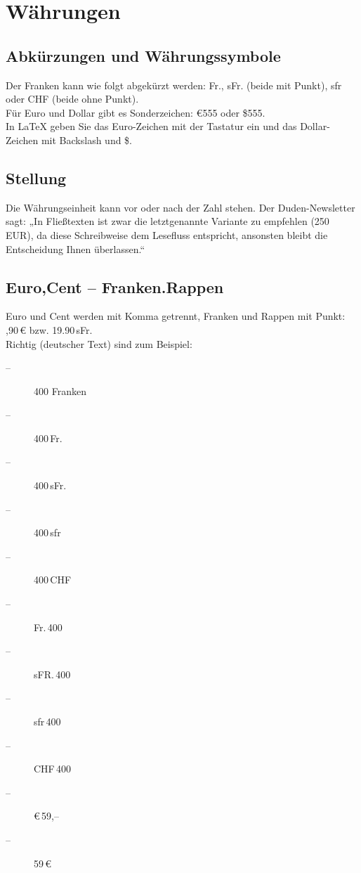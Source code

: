 \section{Währungen}
\subsection{Abkürzungen und Währungssymbole}

Der Franken kann wie folgt abgekürzt werden: Fr., sFr. (beide mit Punkt), sfr oder CHF (beide ohne Punkt). \\

Für Euro und Dollar gibt es Sonderzeichen: €555 oder \$555. \\

In LaTeX geben Sie das Euro-Zeichen mit der Tastatur ein und das Dollar-Zeichen mit Backslash und \$.

\subsection{Stellung}
Die Währungseinheit kann vor oder nach der Zahl stehen. Der Duden-Newsletter sagt: „In Fließtexten ist zwar die letztgenannte Variante zu empfehlen (250 EUR), da diese Schreibweise dem Lesefluss entspricht, ansonsten bleibt die Entscheidung Ihnen überlassen.“

\subsection{Euro,Cent – Franken.Rappen}

Euro und Cent werden mit Komma getrennt, Franken und Rappen mit Punkt: \hfill {},90\,€ bzw. 19.90\,sFr. \\

Richtig (deutscher Text) sind zum Beispiel:
\begin{description}
  \item[--] 400 Franken
  \item[--] 400\,Fr. 
  \item[--] 400\,sFr.
  \item[--] 400\,sfr 
  \item[--] 400\,CHF
  \item[--] Fr.\,400
  \item[--] sFR.\,400 
  \item[--] sfr\,400
  \item[--] CHF\,400 
  \item[--] €\,59,–
  \item[--] 59\,€
\end{description}


